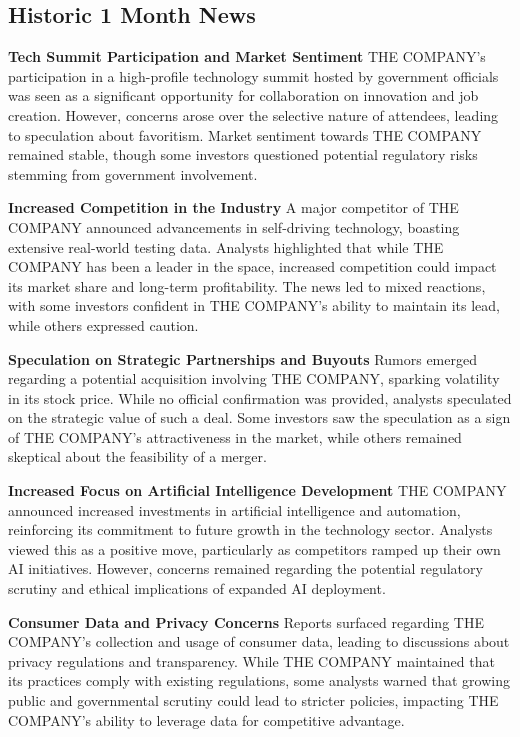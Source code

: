 \documentclass[8pt]{scrartcl}
\begin{document}
\subsection*{Historic 1 Month News}

\textbf{Tech Summit Participation and Market Sentiment}
THE COMPANY's participation in a high-profile technology summit hosted by government officials was seen as a significant opportunity for collaboration on innovation and job creation. However, concerns arose over the selective nature of attendees, leading to speculation about favoritism. Market sentiment towards THE COMPANY remained stable, though some investors questioned potential regulatory risks stemming from government involvement.

\textbf{Increased Competition in the Industry}
A major competitor of THE COMPANY announced advancements in self-driving technology, boasting extensive real-world testing data. Analysts highlighted that while THE COMPANY has been a leader in the space, increased competition could impact its market share and long-term profitability. The news led to mixed reactions, with some investors confident in THE COMPANY’s ability to maintain its lead, while others expressed caution.

\textbf{Speculation on Strategic Partnerships and Buyouts}
Rumors emerged regarding a potential acquisition involving THE COMPANY, sparking volatility in its stock price. While no official confirmation was provided, analysts speculated on the strategic value of such a deal. Some investors saw the speculation as a sign of THE COMPANY's attractiveness in the market, while others remained skeptical about the feasibility of a merger.

\textbf{Increased Focus on Artificial Intelligence Development}
THE COMPANY announced increased investments in artificial intelligence and automation, reinforcing its commitment to future growth in the technology sector. Analysts viewed this as a positive move, particularly as competitors ramped up their own AI initiatives. However, concerns remained regarding the potential regulatory scrutiny and ethical implications of expanded AI deployment.

\textbf{Consumer Data and Privacy Concerns}
Reports surfaced regarding THE COMPANY's collection and usage of consumer data, leading to discussions about privacy regulations and transparency. While THE COMPANY maintained that its practices comply with existing regulations, some analysts warned that growing public and governmental scrutiny could lead to stricter policies, impacting THE COMPANY’s ability to leverage data for competitive advantage.
\end{document}
